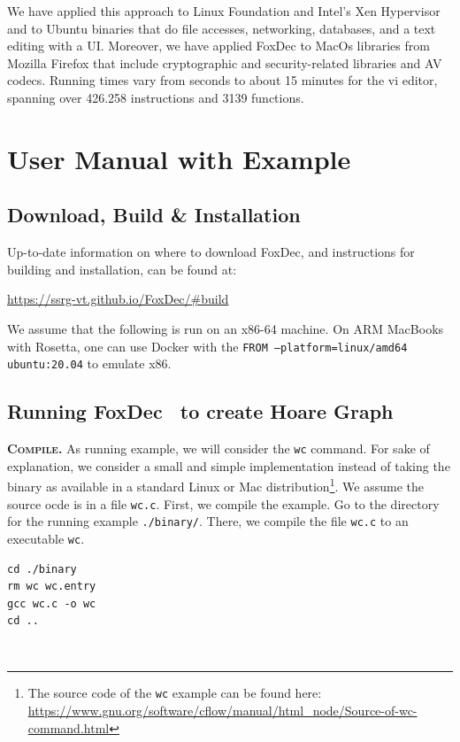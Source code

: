 \documentclass[12pt,a4paper]{article}
\newcommand{\begincodebox}[1]{
\vspace{1ex}
\begin{tcolorbox}[
    enhanced,
    attach boxed title to top left={xshift=6mm,yshift=-3mm},
    colback=moonstoneblue!20,
    colframe=moonstoneblue,
    colbacktitle=moonstoneblue,
    title=#1,
    fonttitle=\bfseries\color{black},
    boxed title style={size=small,colframe=moonstoneblue,sharp corners},
    sharp corners,
]
}
\newcommand{\codeboxend}{\end{tcolorbox}\noindent}
\newcommand{\foxdec}{\textsf{FoxDec}}
\newcommand{\beginpar}[1]{\noindent\textsc{\textbf{#1.}}}
\newcounter{example}
\begin{document}
We have applied this approach to Linux Foundation and Intel’s Xen Hypervisor and to Ubuntu binaries that do file accesses, networking, databases, and a text editing with a UI.
Moreover, we have applied FoxDec to MacOs libraries from Mozilla Firefox that include cryptographic and security-related libraries and AV codecs.
Running times vary from seconds to about 15 minutes for the vi editor, spanning over 426.258 instructions and 3139 functions.





\section{User Manual with Example}


\subsection{Download, Build \& Installation}

Up-to-date information on where to download \foxdec, and instructions for building and installation, can be found at:
\begin{center}
\url{https://ssrg-vt.github.io/FoxDec/#build}
\end{center}

We assume that the following is run on an x86-64 machine. On ARM MacBooks with Rosetta, one can use Docker with the \texttt{FROM --platform=linux/amd64 ubuntu:20.04} to emulate x86.

\subsection{Running \foxdec~ to create Hoare Graph}

\beginpar{Compile} As running example, we will consider the \texttt{wc} command.
For sake of explanation, we consider a small and simple implementation instead of taking the binary as available in a standard Linux or Mac distribution\footnote{The source code of the \texttt{wc} example can be found here:\\\url{https://www.gnu.org/software/cflow/manual/html_node/Source-of-wc-command.html}}.
We assume the source ocde is in a file \texttt{wc.c}.
First, we compile the example. 
Go to the directory for the running example \texttt{./binary/}.
There, we compile the file \texttt{wc.c} to an executable \texttt{wc}.

\begincodebox{Compile the running example}
\begin{verbatim}
cd ./binary
rm wc wc.entry
gcc wc.c -o wc
cd ..
\end{verbatim}
\codeboxend
\\
\end{document}
